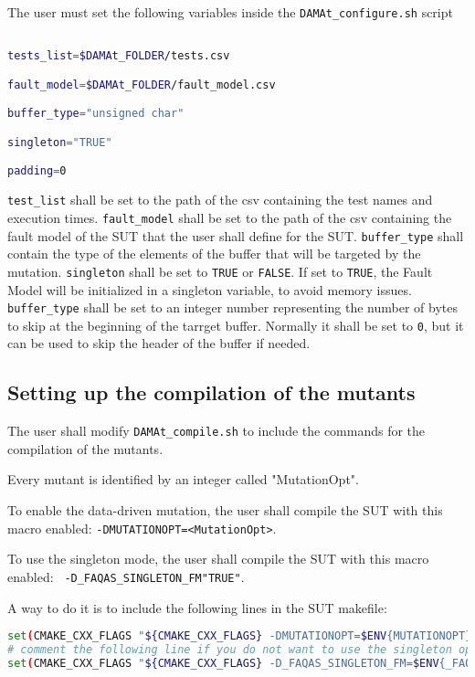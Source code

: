 The user must set the following variables inside the \texttt{DAMAt\_configure.sh} script
\begin{lstlisting}[language=bash]

tests_list=$DAMAt_FOLDER/tests.csv

fault_model=$DAMAt_FOLDER/fault_model.csv

buffer_type="unsigned char"

singleton="TRUE"

padding=0

\end{lstlisting}

\texttt{test\_list} shall be set to the path of the csv containing the test names and execution times.
\texttt{fault\_model} shall be set to the path of the csv containing the fault model of the SUT that the user shall define for the SUT.
\texttt{buffer\_type} shall contain the type of the elements of the buffer that will be targeted by the mutation.
\texttt{singleton} shall be set to \texttt{TRUE} or \texttt{FALSE}. If set to \texttt{TRUE}, the Fault Model will be initialized in a singleton variable, to avoid memory issues.
\texttt{buffer\_type} shall be set to an integer number representing the number of bytes to skip at the beginning of the tarrget buffer. Normally it shall be set to \texttt{0}, but it can be used to skip the header of the buffer if needed.

\subsection{Setting up the compilation of the mutants}

The user shall modify \texttt{DAMAt\_compile.sh} to include the commands for the compilation of the mutants.

Every mutant is identified by an integer called "MutationOpt".

To enable the data-driven mutation, the user shall compile the SUT with this macro enabled: \texttt{-DMUTATIONOPT=<MutationOpt>}.

To use the singleton mode, the user shall compile the SUT with this macro enabled: \texttt{ -D\_FAQAS\_SINGLETON\_FM\="TRUE"}.

A way to do it is to include the following lines in the SUT makefile:

\begin{lstlisting}[language=bash]
set(CMAKE_CXX_FLAGS "${CMAKE_CXX_FLAGS} -DMUTATIONOPT=$ENV{MUTATIONOPT}")
# comment the following line if you do not want to use the singleton option.
set(CMAKE_CXX_FLAGS "${CMAKE_CXX_FLAGS} -D_FAQAS_SINGLETON_FM=$ENV{_FAQAS_SINGLETON_FM}")
\end{lstlisting}

